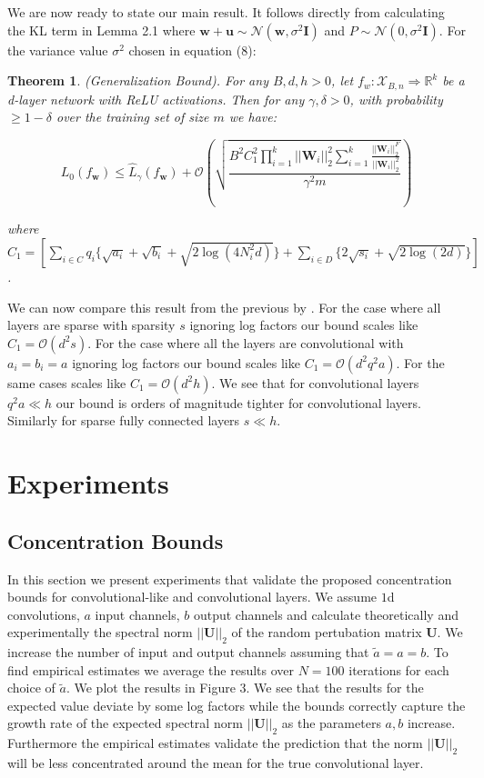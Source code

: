 \documentclass{article} %
\newtheorem{theorem}{Theorem}[section]
\theoremstyle{definition}
\begin{document}
We are now ready to state our main result. It follows directly from calculating the KL term in Lemma 2.1 where $\boldsymbol{w}+\boldsymbol{u} \sim \mathcal{N}(\boldsymbol{w},\sigma^2\boldsymbol{I})$ and $P \sim \mathcal{N}(0,\sigma^2\boldsymbol{I})$. For the variance value $\sigma^2$ chosen in equation (8):
\begin{theorem}
(Generalization Bound). For any  $B ,d ,h >0$, let $f_w:\mathcal{X}_{B,n} \Rightarrow \mathbb{R}^k$ be a d-layer network with ReLU activations. Then for any $\gamma,\delta > 0$, with probability $\geq 1-\delta$ over the training set of size $m$ we have: 

\begin{equation}
L_0(f_{\boldsymbol{w}}) \leq \hat{L}_{\gamma}(f_{\boldsymbol{w}})+\mathcal{O}(\sqrt{\frac{B^2 C_1^2 \prod_{i=1}^{k} ||\boldsymbol{W}_i||_2^2 \sum_{i=1}^k \frac{||\boldsymbol{W}_i||_2^F}{||\boldsymbol{W}_i||_2^2} }{ \gamma^2 m  }}) 
\end{equation}

where $C_1 = [\sum_{i \in C} q_i \{\sqrt{a_i}+\sqrt{b_i}+\sqrt{2\log(4N_i^2d)} \} + \sum_{i \in D} \{2\sqrt{s_i}+\sqrt{2\log(2d)} \}] $.
\end{theorem}
We can now compare this result from the previous by \citet{neyshabur2017pac}. For the case where all layers are sparse with sparsity $s$ ignoring log factors our bound scales like $C_1 = \mathcal{O}(d^2 s)$. For the case where all the layers are convolutional with $a_i = b_i = a$  ignoring log factors our bound scales like $C_1 = \mathcal{O}(d^2 q^2 a)$. For the same cases \citet{neyshabur2017pac} scales like $C_1 = \mathcal{O}(d^2h)$. We see that for convolutional layers $q^2 a \ll h$ our bound is orders of magnitude tighter for convolutional layers. Similarly for sparse fully connected layers $s \ll h$.

\section{Experiments}

\subsection{Concentration Bounds}
In this section we present experiments that validate the proposed concentration bounds for convolutional-like and convolutional layers. We assume $1$d convolutions, $a$ input channels, $b$ output channels and calculate theoretically and experimentally the spectral norm $||\boldsymbol{U}||_2$ of the random pertubation matrix $\boldsymbol{U}$. We increase the number of input and output channels assuming that $\tilde{a} = a = b$. To find empirical estimates we average the results over $N=100$ iterations for each choice of $\tilde{a}$. We plot the results in Figure 3. We see that the results for the expected value deviate by some log factors while the bounds correctly capture the growth rate of the expected spectral norm $||\boldsymbol{U}||_2$ as the parameters $a,b$ increase. Furthermore the empirical estimates validate the prediction that the norm $||\boldsymbol{U}||_2$ will be less concentrated around the mean for the true convolutional layer. 
\end{document}
